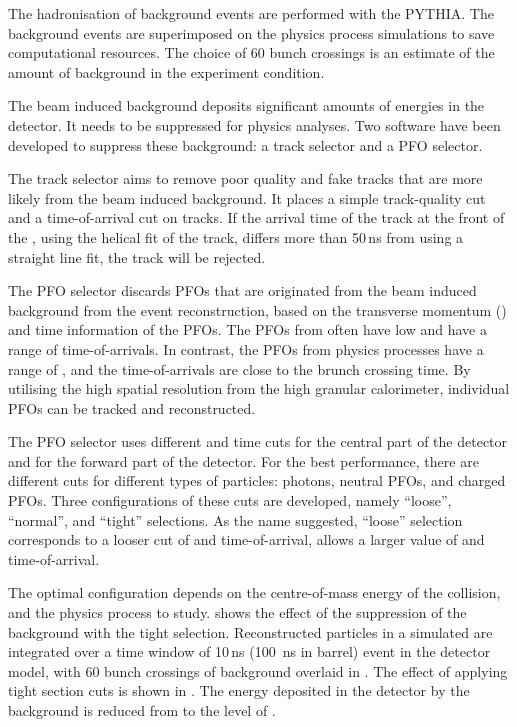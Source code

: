 The hadronisation of  \ggHad background events are performed with the PYTHIA. The  \ggHad background events are superimposed on the physics process simulations to save computational resources. The choice of 60 bunch crossings is an estimate  of  the amount of background in the experiment condition\cite{Barklow:1443518,Barklow:1443518}.

The beam induced background deposits significant amounts of energies in the detector. It needs to be suppressed for physics analyses. Two software have been developed to suppress these background: a track selector and a PFO selector\cite{Marshall:2012ry}.

The track selector aims to remove poor quality and fake tracks that are more likely from the beam induced background. It places a simple track-quality cut and a time-of-arrival cut on tracks. If the arrival time of the track at the front of the \ECAL, using the helical fit of the track, differs more than 50\,ns from using a straight line fit, the track will be rejected.


The PFO selector discards PFOs that are originated from the beam induced background from the event reconstruction, based on the transverse momentum (\pT) and time information of the PFOs. The PFOs from \ggHad often have low \pT and have a range of time-of-arrivals. In contrast, the PFOs from physics processes have a range of \pT, and the time-of-arrivals are close to the brunch crossing time. By utilising the high spatial resolution from the high granular calorimeter, individual PFOs can be tracked and reconstructed. 

The PFO selector uses different \pT and time cuts for the central part of the detector and for the forward part of the detector. For the best performance, there are different cuts for different types of particles: photons, neutral PFOs, and charged PFOs. Three configurations of these cuts are developed, namely ``loose'', ``normal'', and ``tight'' selections. As the name suggested, ``loose'' selection corresponds to a looser cut of \pT and time-of-arrival, allows a larger value of \pT and time-of-arrival. 

The optimal configuration depends on the centre-of-mass energy of the collision, and the physics process to study.  shows the effect of the suppression of the background with the tight \PFO selection. Reconstructed particles  in a simulated \HepProcess{\Pep\Pem \to \PHiggs\PHiggs \to \Ptop\APbottom\Pbottom\APtop}  are integrated over a time window of 10\,ns (100 \,ns in \HCAL barrel) event in the \CLICILD detector model, with 60 bunch crossings of \ggHad background overlaid in . The effect of applying tight \PFO section cuts is shown in . The energy deposited in the detector by the background is reduced from  to the level of .


